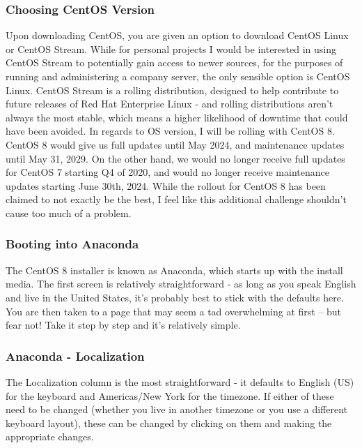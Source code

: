 
\subsubsection{Choosing CentOS Version}
Upon downloading CentOS, you are given an option to download CentOS Linux or CentOS Stream. While for personal projects I would be interested in using CentOS Stream to potentially gain access to newer sources, for the purposes of running and administering a company server, the only sensible option is CentOS Linux. CentOS Stream is a rolling distribution, designed to help contribute to future releases of Red Hat Enterprise Linux - and rolling distributions aren’t always the most stable, which means a higher likelihood of downtime that could have been avoided.
In regards to OS version, I will be rolling with CentOS 8. CentOS 8 would give us full updates until May 2024, and maintenance updates until May 31, 2029. On the other hand, we would no longer receive full updates for CentOS 7 starting Q4 of 2020, and would no longer receive maintenance updates starting June 30th, 2024. 
While the rollout for CentOS 8 has been claimed to not exactly be the best, I feel like this additional challenge shouldn’t cause too much of a problem.

\subsubsection{Booting into Anaconda}
The CentOS 8 installer is known as Anaconda, which starts up with the install media. The first screen is relatively straightforward - as long as you speak English and live in the United States, it’s probably best to stick with the defaults here. You are then taken to a page that may seem a tad overwhelming at first – but fear not! Take it step by step and it’s relatively simple.

\subsubsection{Anaconda - Localization}
The Localization column is the most straightforward - it defaults to English (US) for the keyboard and Americas/New York for the timezone. If either of these need to be changed (whether you live in another timezone or you use a different keyboard layout), these can be changed by clicking on them and making the appropriate changes.

